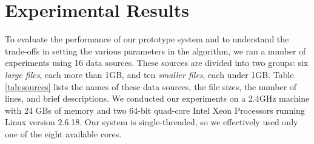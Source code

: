 \section{Experimental Results}
\label{sec:eval}

To evaluate the performance of our prototype system and to understand the
trade-offs in setting the various parameters in the algorithm, we ran a number
of experiments using 16 data sources. These sources are divided into two groups:
six {\em large files}, each more than 1GB, 
and ten {\em smaller files}, each under 1GB. 
Table \ref{tab:sources} lists the names of these data sources, the file sizes,
the number of lines, and brief descriptions. We conducted our experiments
on a 2.4GHz machine with 24 GBs of memory and two 64-bit quad-core Intel Xeon Processors 
running Linux version 2.6.18. Our system is single-threaded, so we effectively used only one of the eight available cores.

